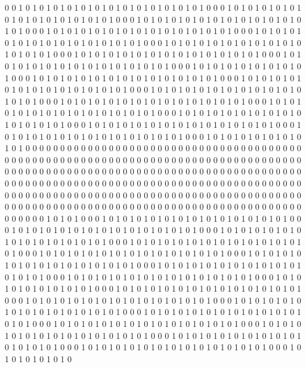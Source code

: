 0 0 1 0 1 0 1 0 1 0 1 0 1 0 1 0 1 0 1 0 1 0 1 0 1 0 1 0 1 0 0 0 1 0 1 0 1 0 1 0 1 0 1 0 1 0 1 0 1 0 1 0 1 0 1 0 1 0 1 0 0 0 1 0 1 0 1 0 1 0 1 0 1 0 1 0 1 0 1 0 1 0 1 0 1 0 1 0 1 0 0 0 1 0 1 0 1 0 1 0 1 0 1 0 1 0 1 0 1 0 1 0 1 0 1 0 1 0 1 0 0 0 1 0 1 0 1 0 1 0 1 0 1 0 1 0 1 0 1 0 1 0 1 0 1 0 1 0 1 0 0 0 1 0 1 0 1 0 1 0 1 0 1 0 1 0 1 0 1 0 1 0 1 0 1 0 1 0 1 0 0 0 1 0 1 0 1 0 1 0 1 0 1 0 1 0 1 0 1 0 1 0 1 0 1 0 1 0 1 0 0 0 1 0 1 0 1 0 1 0 1 0 1 0 1 0 1 0 1 0 1 0 1 0 1 0 1 0 1 0 0 0 1 0 1 0 1 0 1 0 1 0 1 0 1 0 1 0 1 0 
0 0 1 0 1 0 1 0 1 0 1 0 1 0 1 0 1 0 1 0 1 0 1 0 1 0 1 0 1 0 0 0 1 0 1 0 1 0 1 0 1 0 1 0 1 0 1 0 1 0 1 0 1 0 1 0 1 0 1 0 0 0 1 0 1 0 1 0 1 0 1 0 1 0 1 0 1 0 1 0 1 0 1 0 1 0 1 0 1 0 0 0 1 0 1 0 1 0 1 0 1 0 1 0 1 0 1 0 1 0 1 0 1 0 1 0 1 0 1 0 0 0 1 0 1 0 1 0 1 0 1 0 1 0 1 0 1 0 1 0 1 0 1 0 1 0 1 0 1 0 0 0 1 0 1 0 1 0 1 0 1 0 1 0 1 0 1 0 1 0 1 0 1 0 1 0 1 0 1 0 0 0 1 0 1 0 1 0 1 0 1 0 1 0 1 0 1 0 1 0 1 0 1 0 1 0 1 0 1 0 0 0 1 0 1 0 1 0 1 0 1 0 1 0 1 0 1 0 1 0 1 0 1 0 1 0 1 0 1 0 0 0 1 0 1 0 1 0 1 0 1 0 1 0 1 0 1 0 1 0 
0 0 0 0 0 0 0 0 0 0 0 0 0 0 0 0 0 0 0 0 0 0 0 0 0 0 0 0 0 0 0 0 0 0 0 0 0 0 0 0 0 0 0 0 0 0 0 0 0 0 0 0 0 0 0 0 0 0 0 0 0 0 0 0 0 0 0 0 0 0 0 0 0 0 0 0 0 0 0 0 0 0 0 0 0 0 0 0 0 0 0 0 0 0 0 0 0 0 0 0 0 0 0 0 0 0 0 0 0 0 0 0 0 0 0 0 0 0 0 0 0 0 0 0 0 0 0 0 0 0 0 0 0 0 0 0 0 0 0 0 0 0 0 0 0 0 0 0 0 0 0 0 0 0 0 0 0 0 0 0 0 0 0 0 0 0 0 0 0 0 0 0 0 0 0 0 0 0 0 0 0 0 0 0 0 0 0 0 0 0 0 0 0 0 0 0 0 0 0 0 0 0 0 0 0 0 0 0 0 0 0 0 0 0 0 0 0 0 0 0 0 0 0 0 0 0 0 0 0 0 0 0 0 0 0 0 0 0 0 0 0 0 0 0 0 0 0 0 0 0 0 0 0 0 0 0 0 0 0 0 
1 0 1 0 1 0 0 0 1 0 1 0 1 0 1 0 1 0 1 0 1 0 1 0 1 0 1 0 1 0 1 0 1 0 1 0 0 0 1 0 1 0 1 0 1 0 1 0 1 0 1 0 1 0 1 0 1 0 1 0 1 0 1 0 1 0 0 0 1 0 1 0 1 0 1 0 1 0 1 0 1 0 1 0 1 0 1 0 1 0 1 0 1 0 1 0 0 0 1 0 1 0 1 0 1 0 1 0 1 0 1 0 1 0 1 0 1 0 1 0 1 0 1 0 1 0 0 0 1 0 1 0 1 0 1 0 1 0 1 0 1 0 1 0 1 0 1 0 1 0 1 0 1 0 1 0 0 0 1 0 1 0 1 0 1 0 1 0 1 0 1 0 1 0 1 0 1 0 1 0 1 0 1 0 1 0 0 0 1 0 1 0 1 0 1 0 1 0 1 0 1 0 1 0 1 0 1 0 1 0 1 0 1 0 1 0 0 0 1 0 1 0 1 0 1 0 1 0 1 0 1 0 1 0 1 0 1 0 1 0 1 0 1 0 1 0 0 0 1 0 1 0 1 0 1 0 1 0 1 0 
1 0 1 0 1 0 0 0 1 0 1 0 1 0 1 0 1 0 1 0 1 0 1 0 1 0 1 0 1 0 1 0 1 0 1 0 0 0 1 0 1 0 1 0 1 0 1 0 1 0 1 0 1 0 1 0 1 0 1 0 1 0 1 0 1 0 0 0 1 0 1 0 1 0 1 0 1 0 1 0 1 0 1 0 1 0 1 0 1 0 1 0 1 0 1 0 0 0 1 0 1 0 1 0 1 0 1 0 1 0 1 0 1 0 1 0 1 0 1 0 1 0 1 0 1 0 0 0 1 0 1 0 1 0 1 0 1 0 1 0 1 0 1 0 1 0 1 0 1 0 1 0 1 0 1 0 0 0 1 0 1 0 1 0 1 0 1 0 1 0 1 0 1 0 1 0 1 0 1 0 1 0 1 0 1 0 0 0 1 0 1 0 1 0 1 0 1 0 1 0 1 0 1 0 1 0 1 0 1 0 1 0 1 0 1 0 0 0 1 0 1 0 1 0 1 0 1 0 1 0 1 0 1 0 1 0 1 0 1 0 1 0 1 0 1 0 0 0 1 0 1 0 1 0 1 0 1 0 1 0 

